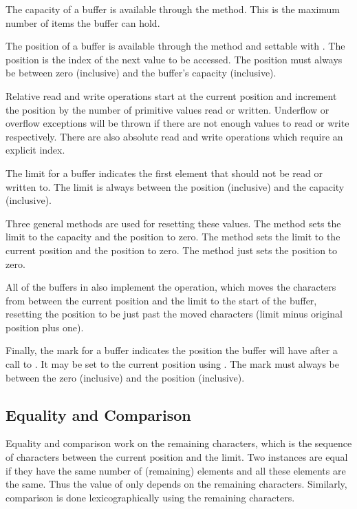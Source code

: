 The capacity of a buffer is available through the 
method.  This is the maximum number of items the buffer can hold.

The position of a buffer is available through the 
method and settable with .  The position is the
index of the next value to be accessed.  The position must always
be between zero (inclusive) and the buffer's capacity (inclusive).

Relative read and write operations start at the current position and
increment the position by the number of primitive values read or
written.  Underflow or overflow exceptions will be thrown if there are
not enough values to read or write respectively.  There are also
absolute read and write operations which require an explicit index.

The limit for a buffer indicates the first element that should not be
read or written to.  The limit is always between the position (inclusive)
and the capacity (inclusive).

Three general methods are used for resetting these values.  The
 method sets the limit to the capacity and the position
to zero.  The  method sets the limit to the current
position and the position to zero.  The  method just
sets the position to zero.  

All of the buffers in  also implement the
 operation, which moves the characters from between
the current position and the limit to the start of the buffer,
resetting the position to be just past the moved characters (limit
minus original position plus one).

Finally, the mark for a buffer indicates the position the buffer will
have after a call to .  It may be set to the current
position using .  The mark must always be between the
zero (inclusive) and the position (inclusive).

\subsection{Equality and Comparison}

Equality and comparison work on the remaining characters, which is the
sequence of characters between the current position and the limit.
Two  instances are equal if they have the same number
of (remaining) elements and all these elements are the same.  Thus the
value of  only depends on the remaining characters.
Similarly, comparison is done lexicographically using the remaining
characters.

